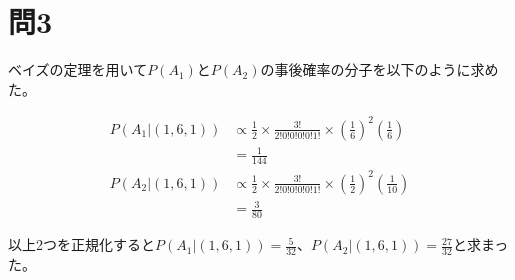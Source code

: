 \section{問3}
\hspace{1em}ベイズの定理を用いて\(P(A_1)\)と\(P(A_2)\)の事後確率の分子を以下のように求めた。

\begin{align}
    P(A_1 | (1, 6, 1))  &\propto \frac{1}{2} \times \frac{3!}{2!0!0!0!0!1!} \times (\frac{1}{6})^2 (\frac{1}{6}) \\
                        &= \frac{1}{144} \\
    P(A_2 | (1, 6, 1))  &\propto \frac{1}{2} \times \frac{3!}{2!0!0!0!0!1!} \times (\frac{1}{2})^2 (\frac{1}{10}) \\
                        &= \frac{3}{80}
\end{align}

\hspace{1em}以上2つを正規化すると\(P(A_1 | (1, 6, 1)) = \frac{5}{32}\)、\(P(A_2 | (1, 6, 1)) = \frac{27}{32}\)と求まった。